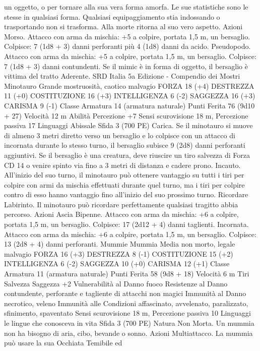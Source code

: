 \begin{multicols}{2}
un oggetto, o per tornare alla sua vera forma amorfa. Le sue
statistiche sono le stesse in qualsiasi forma. Qualsiasi
equipaggiamento stia indossando o trasportando non si
trasforma. Alla morte ritorna al suo vero aspetto.
Azioni
Morso. Attacco con arma da mischia: +5 a colpire, portata 1,5
m, un bersaglio.
Colpisce: 7 (1d8 + 3) danni perforanti più 4 (1d8) danni da
acido.
Pseudopodo. Attacco con arma da mischia: +5 a colpire, portata
1,5 m, un bersaglio.
Colpisce: 7 (1d8 + 3) danni contundenti. Se il mimic è in forma
di oggetto, il bersaglio è vittima del tratto Aderente.
SRD Italia 5a Edizione - Compendio dei Mostri
Minotauro
Grande mostruosità, caotico malvagio
FORZA 18 (+4)
DESTREZZA 11 (+0)
COSTITUZIONE 16 (+3)
INTELLIGENZA 6 (-2)
SAGGEZZA 16 (+3)
CARISMA 9 (-1)
Classe Armatura 14 (armatura naturale)
Punti Ferita 76 (9d10 + 27)
Velocità 12 m
Abilità Percezione +7
Sensi scurovisione 18 m, Percezione passiva 17
Linguaggi Abissale
Sfida 3 (700 PE)
Carica. Se il minotauro si muove di almeno 3 metri diretto verso
un bersaglio e lo colpisce con un attacco di incornata durante lo
stesso turno, il bersaglio subisce 9 (2d8) danni perforanti
aggiuntivi. Se il bersaglio è una creatura, deve riuscire un tiro
salvezza di Forza CD 14 o venire spinto via fino a 3 metri di
distanza e cadere prono.
Incauto. All’inizio del suo turno, il minotauro può ottenere
vantaggio su tutti i tiri per colpire con armi da mischia effettuati
durante quel turno, ma i tiri per colpire contro di esso hanno
vantaggio fino all’inizio del suo prossimo turno.
Ricordare Labirinto. Il minotauro può ricordare perfettamente
qualsiasi tragitto abbia percorso.
Azioni
Ascia Bipenne. Attacco con arma da mischia: +6 a colpire,
portata 1,5 m, un bersaglio.
Colpisce: 17 (2d12 + 4) danni taglienti.
Incornata. Attacco con arma da mischia: +6 a colpire, portata
1,5 m, un bersaglio.
Colpisce: 13 (2d8 + 4) danni perforanti.
Mummie
Mummia
Media non morto, legale malvagio
FORZA 16 (+3)
DESTREZZA 8 (-1)
COSTITUZIONE 15 (+2)
INTELLIGENZA 6 (-2)
SAGGEZZA 10 (+0)
CARISMA 12 (+1)
Classe Armatura 11 (armatura naturale)
Punti Ferita 58 (9d8 + 18)
Velocità 6 m
Tiri Salvezza Saggezza +2
Vulnerabilità al Danno fuoco
Resistenze al Danno contundente, perforante e tagliente di
attacchi non magici
Immunità al Danno necrotico, veleno
Immunità alle Condizioni affascinato, avvelenato, paralizzato,
sfinimento, spaventato
Sensi scurovisione 18 m, Percezione passiva 10
Linguaggi le lingue che conosceva in vita
Sfida 3 (700 PE)
Natura Non Morta. Un mummia non ha bisogno di aria, cibo,
bevande o sonno.
Azioni
Multiattacco. La mummia può usare la sua Occhiata Temibile ed

\end{multicols}
